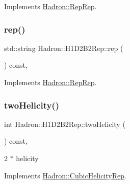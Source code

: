 Implements \mbox{\hyperlink{structHadron_1_1RepRep_ab3213025f6de249f7095892109575fde}{Hadron\+::\+Rep\+Rep}}.

\mbox{\label{structHadron_1_1H1D2B2Rep_a12878ffcfbf3732a19b7b27407e4b026}} 
\subsubsection{\texorpdfstring{rep()}{rep()}\hspace{0.1cm}{\footnotesize\ttfamily [5/5]}}
{\footnotesize\ttfamily std\+::string Hadron\+::\+H1\+D2\+B2\+Rep\+::rep (\begin{DoxyParamCaption}{ }\end{DoxyParamCaption}) const\hspace{0.3cm}{\ttfamily [inline]}, {\ttfamily [virtual]}}



Implements \mbox{\hyperlink{structHadron_1_1RepRep_ab3213025f6de249f7095892109575fde}{Hadron\+::\+Rep\+Rep}}.

\mbox{\label{structHadron_1_1H1D2B2Rep_ac30c0bcd58285d8b5786f2fbfe58ffa2}} 
\subsubsection{\texorpdfstring{twoHelicity()}{twoHelicity()}\hspace{0.1cm}{\footnotesize\ttfamily [1/3]}}
{\footnotesize\ttfamily int Hadron\+::\+H1\+D2\+B2\+Rep\+::two\+Helicity (\begin{DoxyParamCaption}{ }\end{DoxyParamCaption}) const\hspace{0.3cm}{\ttfamily [inline]}, {\ttfamily [virtual]}}

2 $\ast$ helicity 

Implements \mbox{\hyperlink{structHadron_1_1CubicHelicityRep_af507aa56fc2747eacc8cb6c96db31ecc}{Hadron\+::\+Cubic\+Helicity\+Rep}}.

\mbox{\label{structHadron_1_1H1D2B2Rep_ac30c0bcd58285d8b5786f2fbfe58ffa2}} 
